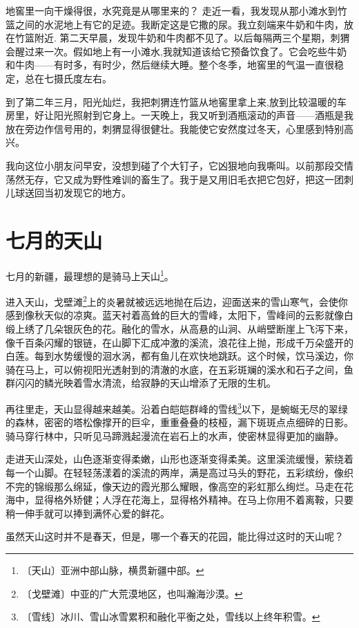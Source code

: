 \documentclass[12pt,UTF-8,openany]{ctexbook}
\begin{document}
\begin{Large}
    地窖里一向干燥得很，水究竟是从哪里来的？ 走近一看，我发现从那小滩水到竹篮之间的水泥地上有它的足迹。我断定这是它撒的尿。我立刻端来牛奶和牛肉，放在竹篮附近. 第二天早晨，发现牛奶和牛肉都不见了。以后每隔两三个星期，刺猬会醒过来一次。假如地上有一小滩水,我就知道该给它预备饮食了。它会吃些牛奶和牛肉——有时多，有时少，然后继续大睡。整个冬季，地窖里的气温一直很稳定，总在七摄氏度左右。
    
    到了第二年三月，阳光灿烂，我把刺猬连竹篮从地窖里拿上来,放到比较温暖的车房里，好让阳光照射到它身上。一天晚上，我又听到酒瓶滚动的声音——酒瓶是我放在旁边作信号用的，刺猬显得很健壮。我能使它安然度过冬天，心里感到特别高兴。
    
    我向这位小朋友问早安，没想到碰了个大钉子，它凶狠地向我嘶叫。以前那段交情荡然无存，它又成为野性难训的畜生了。我于是又用旧毛衣把它包好，把这一团刺儿球送回当初发现它的地方。
    
\end{Large}

\chapter{七月的天山}

\begin{Large}
    
    七月的新疆，最理想的是骑马上天山\footnote{〔天山〕亚洲中部山脉，横贯新疆中部。}。
    
    进入天山，戈壁滩\footnote{〔戈壁滩〕中亚的广大荒漠地区，也叫瀚海沙漠。}上的炎暑就被远远地抛在后边，迎面送来的雪山寒气，会使你感到像秋天似的凉爽。蓝天衬着高耸的巨大的雪峰，太阳下，雪峰间的云影就像白缎上绣了几朵银灰色的花。融化的雪水，从高悬的山涧、从峭壁断崖上飞泻下来，像千百条闪耀的银链，在山脚下汇成冲激的溪流，浪花往上抛，形成千万朵盛开的白莲。每到水势缓慢的洄水涡，都有鱼儿在欢快地跳跃。这个时候，饮马溪边，你骑在马上，可以俯视阳光透射到的清澈的水底，在五彩斑斓的溪水和石子之间，鱼群闪闪的鳞光映着雪水清流，给寂静的天山增添了无限的生机。
    
    再往里走，天山显得越来越美。沿着白皑皑群峰的雪线\footnote{〔雪线〕冰川、雪山冰雪累积和融化平衡之处，雪线以上终年积雪。}以下，是蜿蜒无尽的翠绿的森林，密密的塔松像撑开的巨伞，重重叠叠的枝桠，漏下斑斑点点细碎的日影。骑马穿行林中，只听见马蹄溅起漫流在岩石上的水声，使密林显得更加的幽静。
    
    走进天山深处，山色逐渐变得柔嫩，山形也逐渐变得柔美。这里溪流缓慢，萦绕着每一个山脚。在轻轻荡漾着的溪流的两岸，满是高过马头的野花，五彩缤纷，像织不完的锦缎那么绵延，像天边的霞光那么耀眼，像高空的彩虹那么绚烂。马走在花海中，显得格外矫健；人浮在花海上，显得格外精神。在马上你用不着离鞍，只要稍一伸手就可以捧到满怀心爱的鲜花。
    
    虽然天山这时并不是春天，但是，哪一个春天的花园，能比得过这时的天山呢？
    
\end{Large}
\end{document}
